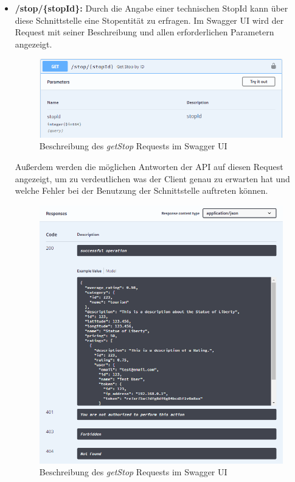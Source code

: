 	\begin{itemize}
		\item \textbf{/stop/\{stopId\}:} Durch die Angabe einer technischen StopId kann über diese Schnittstelle eine Stopentität zu erfragen. Im Swagger UI wird der Request mit seiner Beschreibung und allen erforderlichen Parametern angezeigt.  
		
		\begin{figure}[ht!]
			\centering
			\includegraphics[width=1\textwidth]{images/swagger_getStop_head.png}
			\caption{Beschreibung des \textit{getStop} Requests im Swagger UI}
			\label{fig:swagger_getStop_head}
		\end{figure} 
		
		Außerdem werden die möglichen Antworten der API auf diesen Request angezeigt, um zu verdeutlichen was der Client genau zu erwarten hat und welche Fehler bei der Benutzung der Schnittstelle auftreten können.
		
		\begin{figure}[ht!]
			\centering
			\includegraphics[width=1\textwidth]{images/swagger_getStop_response.png}
			\caption{Beschreibung des \textit{getStop} Requests im Swagger UI}
			\label{fig:swagger_getStop_response}
		\end{figure}
	

\end{itemize}
